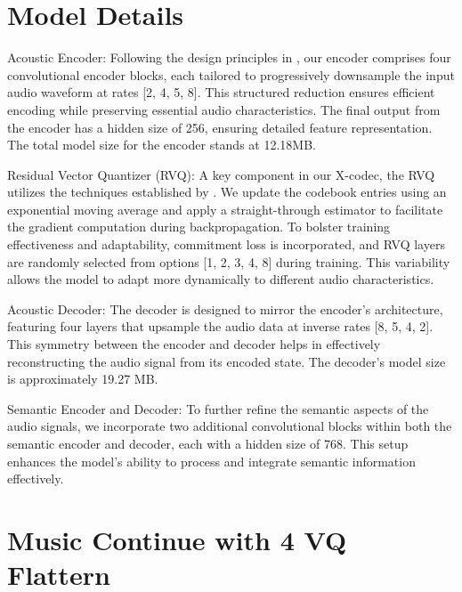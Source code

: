 \section{Model Details}


Acoustic Encoder: Following the design principles in \cite{kumar2024high}, our encoder comprises four convolutional encoder blocks, each tailored to progressively downsample the input audio waveform at rates [2, 4, 5, 8]. This structured reduction ensures efficient encoding while preserving essential audio characteristics. The final output from the encoder has a hidden size of 256, ensuring detailed feature representation. The total model size for the encoder stands at 12.18MB.

Residual Vector Quantizer (RVQ): A key component in our X-codec, the RVQ utilizes the techniques established by \cite{zeghidour2021soundstream}. We update the codebook entries using an exponential moving average and apply a straight-through estimator to facilitate the gradient computation during backpropagation. To bolster training effectiveness and adaptability, commitment loss is incorporated, and RVQ layers are randomly selected from options [1, 2, 3, 4, 8] during training. This variability allows the model to adapt more dynamically to different audio characteristics.

Acoustic Decoder: The decoder is designed to mirror the encoder’s architecture, featuring four layers that upsample the audio data at inverse rates [8, 5, 4, 2]. This symmetry between the encoder and decoder helps in effectively reconstructing the audio signal from its encoded state. The decoder's model size is approximately 19.27 MB.

Semantic Encoder and Decoder: To further refine the semantic aspects of the audio signals, we incorporate two additional convolutional blocks within both the semantic encoder and decoder, each with a hidden size of 768. This setup enhances the model’s ability to process and integrate semantic information effectively.
\section{Music Continue with 4 VQ Flattern}

